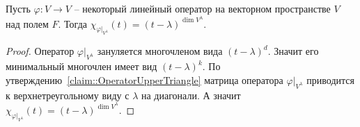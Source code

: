 \begin{claim}
\label{claim::CharPolyOnRootSpace}
Пусть $\varphi\colon V\to V$ -- некоторый линейный оператор на векторном пространстве $V$ над полем $F$.
Тогда $\chi_{\varphi|_{V^\lambda}} (t) = (t - \lambda)^{\dim V^\lambda}$.
\end{claim}
\begin{proof}
Оператор $\varphi|_{V^\lambda}$ зануляется многочленом вида $(t-\lambda)^d$.
Значит его минимальный многочлен имеет вид $(t-\lambda)^k$.
По утверждению~\ref{claim::OperatorUpperTriangle} матрица оператора $\varphi|_{V^\lambda}$ приводится к верхнетреугольному виду с $\lambda$ на диагонали.
А значит $\chi_{\varphi|_{V^\lambda}}(t) = (t - \lambda)^{\dim V^{\lambda}}$.
\end{proof}
